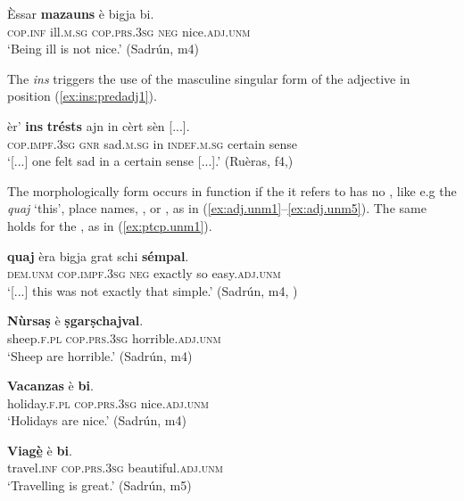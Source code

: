  \ea
 \label{ex:adjpred:inf}
  \gll Èssar \textbf{mazauns} è bigja bi.\\
 \textsc{cop.inf} ill.\textsc{m.sg} \textsc{cop.prs.3sg} \textsc{neg} nice.\textsc{adj.unm}\\
 \glt `Being ill is not nice.' (Sadrún, m4)
 \z
 
 The  \textit{ins} triggers the use of the masculine singular form of the adjective in  position (\ref{ex:ins:predadj1}).
 
 \ea
 \label{ex:ins:predadj1}
  \gll  [...] èr’ \textbf{ins} \textbf{trésts} ajn in cèrt sèn [...].\\
 {} \textsc{cop.impf.3sg} \textsc{gnr} sad.\textsc{m.sg} in \textsc{indef.m.sg} certain sense\\
 \glt `[...] one felt sad in a certain sense [...].' (Ruèras, f4,)
 \z
 
 The morphologically  form occurs in  function if the  it refers to has no , like e.g the  \textit{quaj} `this', place names,  , or , as in (\ref{ex:adj.unm1}--\ref{ex:adj.unm5}). The same holds for the  , as in (\ref{ex:ptcp.unm1}).

\ea\label{ex:adj.unm1}
\gll  […] \textbf{quaj} èra bigja grat schi \textbf{sémpal}.  \\
{} \textsc{dem.unm} \textsc{cop.impf.3sg} \textsc{neg} exactly so easy.\textsc{adj.unm}\\
\glt `[...] this was not exactly that simple.' (Sadrún, m4, )
\z

\ea\label{ex:adj.unm2}
\gll \textbf{Nùrsaṣ} è \textbf{ṣgarṣchajval}.\\
sheep.\textsc{f.pl} \textsc{cop.prs.3sg} horrible.\textsc{adj.unm}\\
\glt `Sheep are horrible.' (Sadrún, m4)
\z

\ea\label{ex:adj.unm3}
\gll \textbf{Vacanzas} è \textbf{bi}.\\
holiday.\textsc{f.pl} \textsc{cop.prs.3sg} nice.\textsc{adj.unm}\\
\glt `Holidays are nice.' (Sadrún, m4)
\z

\ea\label{ex:adj.unm4}
\gll  \textbf{Viag{\`e̱}} è \textbf{bi}.\\
travel.\textsc{inf} \textsc{cop.prs.3sg} beautiful.\textsc{adj.unm}\\
\glt `Travelling is great.' (Sadrún, m5)
\z

